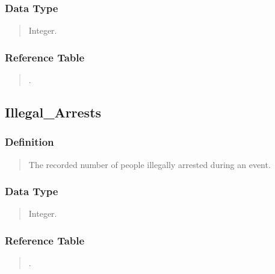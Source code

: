 \documentclass[letterpaper,10pt,english]{sphinxmanual}
\begin{document}
\subsubsection{Data Type}
\label{\detokenize{database_schema:id56}}\begin{quote}

\sphinxAtStartPar
Integer.
\end{quote}


\subsubsection{Reference Table}
\label{\detokenize{database_schema:id57}}\begin{quote}

\sphinxAtStartPar
{\hyperref[\detokenize{database_schema:overview-table}]{}}.
\end{quote}


\subsection{Illegal\_Arrests}
\label{\detokenize{database_schema:illegal-arrests}}

\subsubsection{Definition}
\label{\detokenize{database_schema:id58}}\begin{quote}

\sphinxAtStartPar
The recorded number of people illegally arrested during an event.
\end{quote}


\subsubsection{Data Type}
\label{\detokenize{database_schema:id59}}\begin{quote}

\sphinxAtStartPar
Integer.
\end{quote}


\subsubsection{Reference Table}
\label{\detokenize{database_schema:id60}}\begin{quote}

\sphinxAtStartPar
{\hyperref[\detokenize{database_schema:overview-table}]{}}.
\end{quote}
\end{document}

